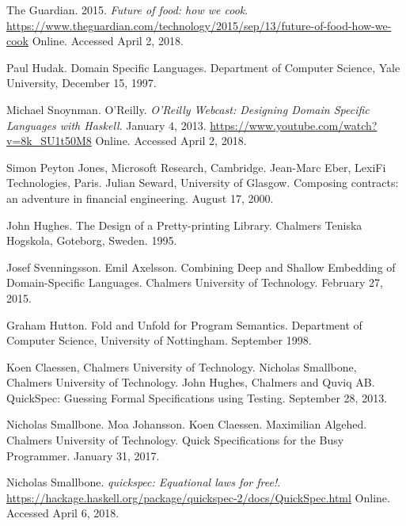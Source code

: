 \documentclass[11pt]{article}
\begin{document}
\newpage

    \begin{thebibliography}{13}

        The Guardian. 2015. \textit{Future of food: how we cook}.
        \url{https://www.theguardian.com/technology/2015/sep/13/future-of-food-how-we-cook}
        Online. Accessed April 2, 2018.

        Paul Hudak. Domain Specific Languages. Department of Computer
        Science, Yale University, December 15, 1997.

        Michael Snoynman. O'Reilly. \textit{O'Reilly Webcast: Designing
        Domain Specific Languages with Haskell}. January 4, 2013.
        \url{https://www.youtube.com/watch?v=8k_SU1t50M8}
        Online. Accessed April 2, 2018.

        Simon Peyton Jones, Microsoft Research, Cambridge.
        Jean-Marc Eber, LexiFi Technologies, Paris. Julian Seward,
        University of Glasgow. Composing contracts: an adventure in
        financial engineering. August 17, 2000.

        John Hughes. The Design of a Pretty-printing Library.
        Chalmers Teniska Hogskola, Goteborg, Sweden. 1995.

        Josef Svenningsson. Emil Axelsson. Combining Deep and Shallow
        Embedding of Domain-Specific Languages. Chalmers University
        of Technology. February 27, 2015.

        Graham Hutton. Fold and Unfold for Program Semantics. Department of
        Computer Science, University of Nottingham. September 1998.

        Koen Claessen, Chalmers University of Technology. Nicholas Smallbone,
        Chalmers University of Technology. John Hughes, Chalmers and Quviq AB.
        QuickSpec: Guessing Formal Specifications using Testing.
        September 28, 2013.

        Nicholas Smallbone. Moa Johansson. Koen Claessen. Maximilian Algehed.
        Chalmers University of Technology.
        Quick Specifications for the Busy Programmer. January 31, 2017.

        Nicholas Smallbone. \textit{quickspec: Equational laws for free!}.
        \url{https://hackage.haskell.org/package/quickspec-2/docs/QuickSpec.html}
        Online. Accessed April 6, 2018.


\end{thebibliography}
\end{document}
